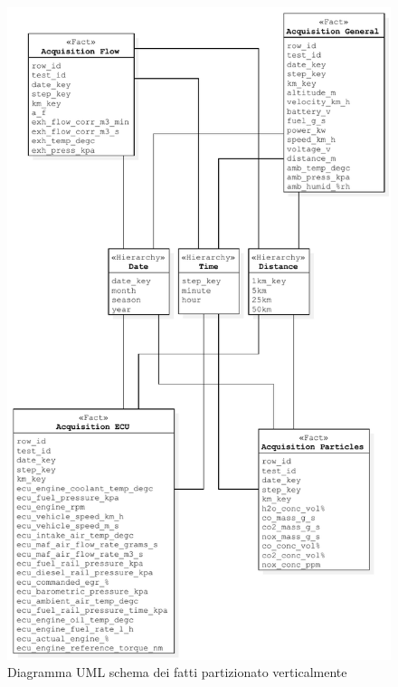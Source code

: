 \begin{figure}[H]
	\centering
	\includegraphics[scale=0.6]{figures/class_fact_scheme_part} %
	\caption{Diagramma UML schema dei fatti partizionato verticalmente}
	\label{fig:ofm}
\end{figure}
\newpage
